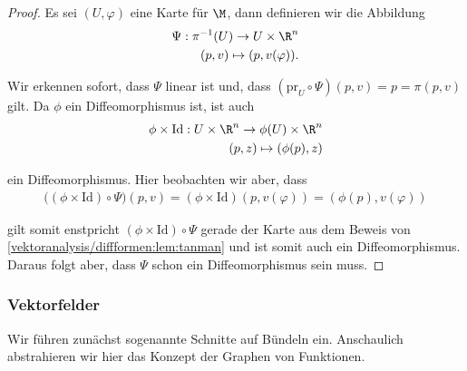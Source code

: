 \documentclass[letterpaper,10pt,english]{jupyterBook}
\begin{document}
\begin{proof}
 Es sei \((U,\varphi)\) eine Karte für \(\M\), dann definieren wir die Abbildung
\begin{align*}
\Psi: \pi^{-1}(U)\to U\times \R^n\\
(p,v)\mapsto (p, v(\varphi)).
\end{align*}
\par
Wir erkennen sofort, dass \(\Psi\) linear ist und, dass \((\text{pr}_U\circ\Psi)(p,v) = p = \pi(p,v)\) gilt.
Da \(\phi\) ein Diffeomorphismus ist, ist auch
\begin{align*}
\phi\times\text{Id}:U\times \R^n\to \phi(U)\times\R^n\\
(p,z)\mapsto (\phi(p), z)
\end{align*}
\par
ein Diffeomorphismus. Hier beobachten wir aber, dass
\begin{align*}
\big((\phi\times\text{Id})\circ \Psi\big)(p,v) = (\phi\times\text{Id})(p, v(\varphi)) = (\phi(p), v(\varphi))
\end{align*}
\par
gilt somit enstpricht \((\phi\times\text{Id})\circ \Psi\) gerade der Karte aus dem Beweis von \cref{vektoranalysis/diffformen:lem:tanman} und ist somit auch ein Diffeomorphismus. Daraus folgt aber, dass \(\Psi\) schon ein Diffeomorphismus sein muss.
\end{proof}


\subsubsection{Vektorfelder}
\label{\detokenize{vektoranalysis/diffformen:vektorfelder}}
\par
Wir führen zunächst sogenannte Schnitte auf Bündeln ein. Anschaulich abstrahieren wir hier das Konzept der Graphen von Funktionen.
\end{document}
